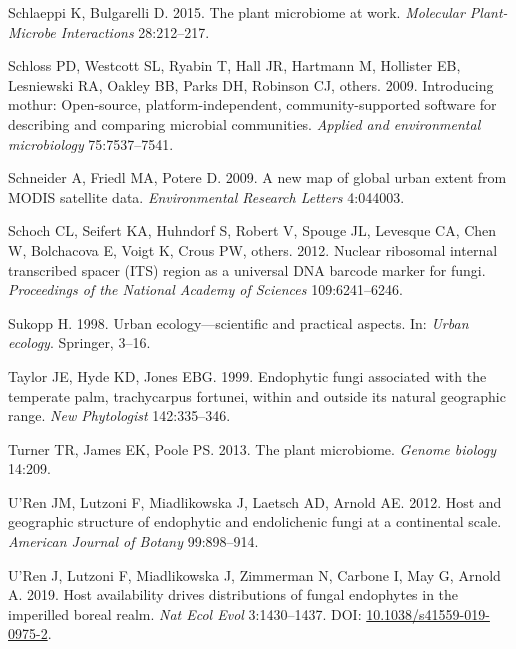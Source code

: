 \documentclass[fleqn,10pt,lineno]{wlpeerj} %
\newlength{\cslhangindent}
\newenvironment{CSLReferences}[2] %
 {%
  \setlength{\parindent}{0pt}
  \ifodd #1 \everypar{\setlength{\hangindent}{\cslhangindent}}\ignorespaces\fi
  \ifnum #2 > 0
  \setlength{\parskip}{#2\baselineskip}
  \fi
 }%
 {}
\begin{document}
\begin{CSLReferences}{1}{0}
\leavevmode{}%
Schlaeppi K, Bulgarelli D. 2015. The plant microbiome at work. \emph{Molecular Plant-Microbe Interactions} 28:212--217.

\leavevmode{}%
Schloss PD, Westcott SL, Ryabin T, Hall JR, Hartmann M, Hollister EB, Lesniewski RA, Oakley BB, Parks DH, Robinson CJ, others. 2009. Introducing mothur: Open-source, platform-independent, community-supported software for describing and comparing microbial communities. \emph{Applied and environmental microbiology} 75:7537--7541.

\leavevmode{}%
Schneider A, Friedl MA, Potere D. 2009. A new map of global urban extent from MODIS satellite data. \emph{Environmental Research Letters} 4:044003.

\leavevmode{}%
Schoch CL, Seifert KA, Huhndorf S, Robert V, Spouge JL, Levesque CA, Chen W, Bolchacova E, Voigt K, Crous PW, others. 2012. Nuclear ribosomal internal transcribed spacer (ITS) region as a universal DNA barcode marker for fungi. \emph{Proceedings of the National Academy of Sciences} 109:6241--6246.

\leavevmode{}%
Sukopp H. 1998. Urban ecology---scientific and practical aspects. In: \emph{Urban ecology}. Springer, 3--16.

\leavevmode{}%
Taylor JE, Hyde KD, Jones EBG. 1999. Endophytic fungi associated with the temperate palm, trachycarpus fortunei, within and outside its natural geographic range. \emph{New Phytologist} 142:335--346.

\leavevmode{}%
Turner TR, James EK, Poole PS. 2013. The plant microbiome. \emph{Genome biology} 14:209.

\leavevmode{}%
U'Ren JM, Lutzoni F, Miadlikowska J, Laetsch AD, Arnold AE. 2012. Host and geographic structure of endophytic and endolichenic fungi at a continental scale. \emph{American Journal of Botany} 99:898--914.

\leavevmode{}%
U'Ren J, Lutzoni F, Miadlikowska J, Zimmerman N, Carbone I, May G, Arnold A. 2019. Host availability drives distributions of fungal endophytes in the imperilled boreal realm. \emph{Nat Ecol Evol} 3:1430--1437. DOI: \href{https://doi.org/10.1038/s41559-019-0975-2}{10.1038/s41559-019-0975-2}.


\end{CSLReferences}
\end{document}
